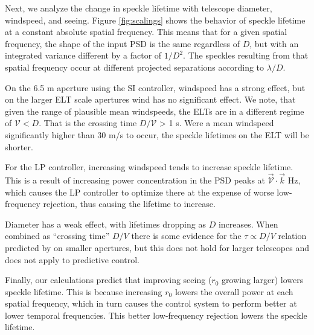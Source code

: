 \documentclass[11pt,preprint]{aastex}
\begin{document}
Next, we analyze the change in speckle lifetime with telescope diameter, windspeed, and seeing.  Figure \ref{fig:scalings} shows the behavior of speckle lifetime at a constant absolute spatial frequency.  This means that for a given spatial frequency, the shape of the input PSD is the same regardless of $D$, but with an integrated variance different by a factor of $1/D^2$.  The speckles resulting from that spatial frequency occur at different projected separations according to $\lambda/D$.  

On the 6.5 m aperture using the SI controller, windspeed has a strong effect, but on the larger ELT scale apertures wind has no significant effect.  We note, that given the range of plausible mean windspeeds, the ELTs are in a different regime of $\mathcal{V} < D$.  That is the crossing time $D/\mathcal{V}$ > 1 s.  Were a mean windspeed significantly higher than 30 m/s to occur, the speckle lifetimes on the ELT will be shorter.   

For the LP controller, increasing windspeed tends to increase speckle lifetime.  This is a result of increasing power concentration in the PSD peaks at $\vec{\mathcal{V}} \cdot \vec{k}$ Hz, which causes the LP controller to optimize there at the expense of worse low-frequency rejection, thus causing the lifetime to increase.

Diameter has a weak effect, with lifetimes dropping as $D$ increases.  When combined as ``crossing time'' $D/V$ there is some evidence for the $\tau \propto D/V$ relation predicted by \citet{2005SPIE.5903..170M} on smaller apertures, but this does not hold for larger telescopes and does not apply to predictive control.  

Finally, our calculations predict that improving seeing ($r_0$ growing larger) lowers speckle lifetime.  This is because increasing $r_0$ lowers the overall power at each spatial frequency, which in turn causes the control system to perform better at lower temporal frequencies.  This better low-frequency rejection lowers the speckle lifetime.
\end{document}
